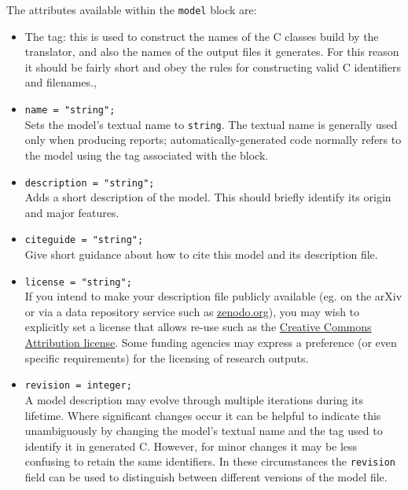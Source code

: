 \documentclass[11pt,a4paper]{article}
\newcommand{\block}[1]{\texttt{#1}}
\newcommand{\attribute}[1]{\texttt{#1}}
\newcommand\CC{C\nolinebreak\hspace{-.05em}\raisebox{.4ex}{\relsize{-3}{\textbf{+}}}\nolinebreak\hspace{-.10em}\raisebox{.4ex}{\relsize{-3}{\textbf{+}}}}
\begin{document}
The attributes available within the \block{model} block are:
\begin{itemize}
	\item The tag: this is used to construct the names of the
	{\CC} classes build by the translator,
	and also the names of the output files it generates.
	For this reason it should be fairly short and obey the
	rules for constructing valid {\CC} identifiers and
	filenames.,

    \item \attribute{name = "string";} \\
    Sets the model's textual name to \attribute{string}. The textual name
    is generally used only when producing reports;
    automatically-generated code normally refers to the model
    using the tag associated with the block.
    
    \item \attribute{description = "string";} \\
    Adds a short description of the model. This should briefly identify
    its origin and major features.
    
    \item \attribute{citeguide = "string";} \\
    Give short guidance about how to cite this model and its description file.
    
    \item \attribute{license = "string";} \\
    If you intend to make your description file publicly available (eg. on the
    arXiv or via a data repository service such as
    \href{http://www.zenodo.org}{zenodo.org}),
    you may wish to explicitly set a license that allows re-use
    such as the
    \href{https://creativecommons.org/licenses/}{Creative Commons Attribution license}.
    Some funding agencies may express a preference
    (or even specific requirements) for the licensing of research outputs.
    
    \item \attribute{revision = integer;} \\
    A model description may evolve through multiple iterations during its
    lifetime.
    Where significant changes occur it can be helpful to indicate this
    unambiguously by changing the model's textual name and the tag
    used to identify it in generated {\CC}.
    However, for minor changes it may be less confusing to retain
    the same identifiers. In these circumstances the
    \attribute{revision} field can be used to
    distinguish between different versions
    of the model file.
    

\end{itemize}
\end{document}
